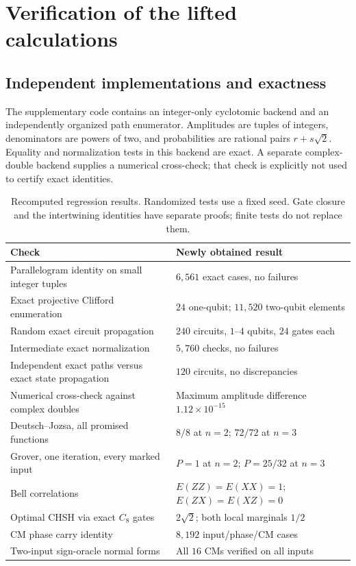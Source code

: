 \section{Verification of the lifted calculations}\label{sec:verification}
\subsection{Independent implementations and exactness}
The supplementary code contains an integer-only cyclotomic backend and an independently organized path enumerator. Amplitudes are tuples of integers, denominators are powers of two, and probabilities are rational pairs $r+s\sqrt2$. Equality and normalization tests in this backend are exact. A separate complex-double backend supplies a numerical cross-check; that check is explicitly not used to certify exact identities.

\begin{table}[htbp]
\centering\small
\begin{tabularx}{\textwidth}{@{}Y L{0.38\textwidth}@{}}
\toprule
Check & Newly obtained result\\
\midrule
Parallelogram identity on small integer tuples & $6{,}561$ exact cases, no failures\\
Exact projective Clifford enumeration & $24$ one-qubit; $11{,}520$ two-qubit elements\\
Random exact circuit propagation & $240$ circuits, $1$--$4$ qubits, $24$ gates each\\
Intermediate exact normalization & $5{,}760$ checks, no failures\\
Independent exact paths versus exact state propagation & $120$ circuits, no discrepancies\\
Numerical cross-check against complex doubles & Maximum amplitude difference $1.12\times10^{-15}$\\
Deutsch--Jozsa, all promised functions & $8/8$ at $n=2$; $72/72$ at $n=3$\\
Grover, one iteration, every marked input & $P=1$ at $n=2$; $P=25/32$ at $n=3$\\
Bell correlations & $E(ZZ)=E(XX)=1$; $E(ZX)=E(XZ)=0$\\
Optimal CHSH via exact $C_8$ gates & $2\sqrt2$; both local marginals $1/2$\\
CM phase carry identity & $8{,}192$ input/phase/CM cases\\
Two-input sign-oracle normal forms & All $16$ CMs verified on all inputs\\
\bottomrule
\end{tabularx}
\caption{Recomputed regression results. Randomized tests use a fixed seed. Gate closure and the intertwining identities have separate proofs; finite tests do not replace them.}
\label{tab:quantum}
\end{table}

